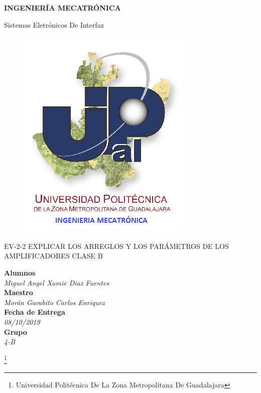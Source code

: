 \documentclass[11pt,a4paper]{article}
\author{Miguel Angel Xamie Diaz Fuentes}
\begin{document}
\begin{center}
\begin{LARGE}
\textbf{INGENIERÍA MECATRÓNICA}\\
\end{LARGE}
{\large Sistemas Eletrónicos De Interfaz}\\
\begin{figure}[hbtp]
\centering
\includegraphics[scale=0.80]{UPZMG_Mecatr_nica.png}
\end{figure} 
\begin{center}
\begin{LARGE}
EV-2-2 EXPLICAR LOS ARREGLOS Y LOS PARÁMETROS DE LOS AMPLIFICADORES CLASE B
\end{LARGE}
\end{center}

\begin{Large}
\textbf{Alumnos}
\\\textit{Miguel Angel Xamie Diaz Fuentes}
\textbf{\\Maestro}
\\\textit{Morán Garabito Carlos Enriquez}
\textbf{\\Fecha de Entrega}
\\\textit{08/10/2019}
\textbf{\\Grupo}
\\\textit{4-B}
\end{Large}

\end{center}

\footnote{Universidad Politécnica De La Zona Metropolitana De Guadalajara} 
\end{document}
